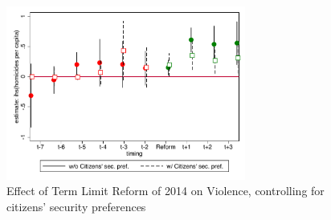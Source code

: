 \documentclass{beamer}
\begin{document}
\begin{frame}[label=citizens_preferences_ihs, noframenumbering]
\begin{figure}[H]
\centering
\caption{Effect of Term Limit Reform of 2014 on Violence, controlling for citizens' security preferences}
  \label{fig:citizens_preferences_ihs} 

 \includegraphics[width=0.7\textwidth]{Figures_pres/citizens_preferences_ihs.pdf}
     \captionsetup{justification=centering}  
        
\end{figure}  
  \hyperlink{alternative_explanations}{} 

\end{frame}
   
\end{document}

